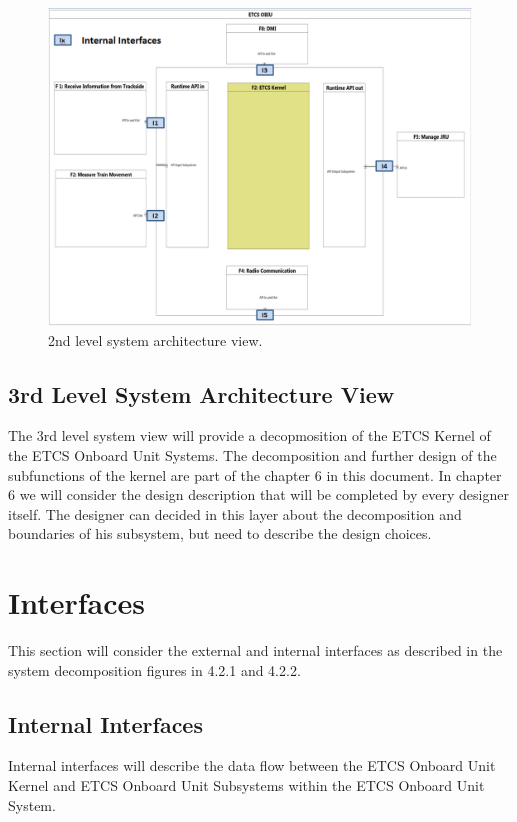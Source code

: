 \begin{figure}
\centering
\includegraphics[width=\textwidth]{images/2ndlevelarchitecture}
\caption{2nd level system architecture view.}
\label{2nd level System Architecture view}
\end{figure}

\subsection{3rd Level System Architecture View}
The 3rd level system view will provide a decopmosition of the ETCS Kernel of the ETCS Onboard Unit Systems. The decomposition and further design of the subfunctions of the kernel are part of the chapter 6 in this document. In chapter 6 we will consider the design description that will be completed by every designer itself. The designer can decided in this layer about the decomposition and boundaries of his subsystem, but need to describe the design choices.


\section{Interfaces}
This section will consider the external and internal interfaces as described in the system decomposition figures in 4.2.1 and 4.2.2.



\subsection{Internal Interfaces}
Internal interfaces will describe the data flow between the ETCS Onboard Unit Kernel and ETCS Onboard Unit Subsystems within the ETCS Onboard Unit System.

